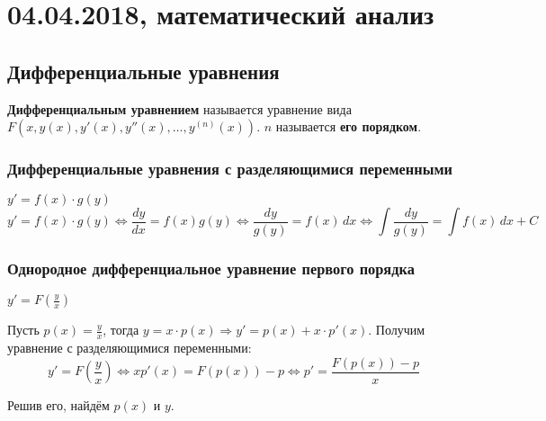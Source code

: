 \chapter{04.04.2018, математический анализ}
\section{Дифференциальные уравнения}
\textbf{Дифференциальным уравнением} называется уравнение вида~$F(x, y(x), y'(x), y''(x), \ldots, y^{(n)}(x))$.
$n$ называется \textbf{его порядком}.

\subsection{Дифференциальные уравнения с разделяющимися переменными}
$y' = f(x) \cdot g(y)$
\begin{equation*}
y' = f(x) \cdot g(y) \Leftrightarrow
\frac{dy}{dx} = f(x)g(y) \Leftrightarrow
\frac{dy}{g(y)} = f(x)\,dx \Leftrightarrow
\int \frac{dy}{g(y)} = \int f(x)\,dx + C
\end{equation*}

\subsection{Однородное дифференциальное уравнение первого порядка}
$y' = F \left( \frac{y}x \right)$

Пусть $p(x) = \frac{y}x$, тогда $y = x \cdot p(x) \Rightarrow y' = p(x) + x \cdot p'(x)$.
Получим уравнение с разделяющимися переменными:
\begin{equation*}
y' = F \left( \frac{y}x \right) \Leftrightarrow
x p'(x) = F(p(x)) - p \Leftrightarrow
p' = \frac{F(p(x)) - p}x
\end{equation*}

Решив его, найдём $p(x)$ и $y$.